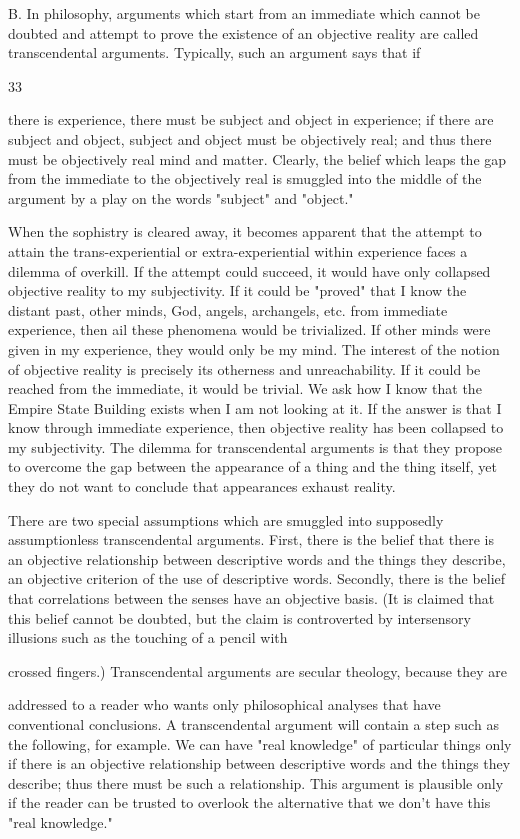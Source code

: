 \documentclass[10pt,twoside]{memoir}
\begin{document}
\begin{enumerate}
{{{{{B. In philosophy, arguments which start from an immediate which 
cannot be doubted and attempt to prove the existence of an objective reality 
are called transcendental arguments. Typically, such an argument says that if 


33 


there is experience, there must be subject and object in experience; if there 
are subject and object, subject and object must be objectively real; and thus 
there must be objectively real mind and matter. Clearly, the belief which 
leaps the gap from the immediate to the objectively real is smuggled into the 
middle of the argument by a play on the words "subject" and "object." 

When the sophistry is cleared away, it becomes apparent that the 
attempt to attain the trans-experiential or extra-experiential within 
experience faces a dilemma of overkill. If the attempt could succeed, it 
would have only collapsed objective reality to my subjectivity. If it could be 
"proved" that I know the distant past, other minds, God, angels, archangels, 
etc. from immediate experience, then ail these phenomena would be 
trivialized. If other minds were given in my experience, they would only be 
my mind. The interest of the notion of objective reality is precisely its 
otherness and unreachability. If it could be reached from the immediate, it 
would be trivial. We ask how I know that the Empire State Building exists 
when I am not looking at it. If the answer is that I know through immediate 
experience, then objective reality has been collapsed to my subjectivity. The 
dilemma for transcendental arguments is that they propose to overcome the 
gap between the appearance of a thing and the thing itself, yet they do not 
want to conclude that appearances exhaust reality. 

There are two special assumptions which are smuggled into supposedly 
assumptionless transcendental arguments. First, there is the belief that there 
is an objective relationship between descriptive words and the things they 
describe, an objective criterion of the use of descriptive words. Secondly, 
there is the belief that correlations between the senses have an objective 
basis. (It is claimed that this belief cannot be doubted, but the claim is 
controverted by intersensory illusions such as the touching of a pencil with 


crossed fingers.) 
Transcendental arguments are secular theology, because they are 


addressed to a reader who wants only philosophical analyses that have 
conventional conclusions. A transcendental argument will contain a step 
such as the following, for example. We can have "real knowledge" of 
particular things only if there is an objective relationship between descriptive 
words and the things they describe; thus there must be such a relationship. 
This argument is plausible only if the reader can be trusted to overlook the 
alternative that we don't have this "real knowledge." 

}}}}}
\end{enumerate}
\end{document}
